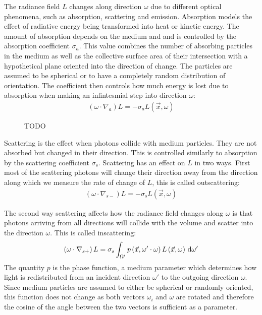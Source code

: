 The radiance field $L$ changes along direction $\omega$ due to different optical phenomena, such as absorption, scattering and emission. Absorption models the effect of radiative energy being transformed into heat or kinetic energy. The amount of absorption depends on the medium and and is controlled by the absorption coefficient $\sigma_a$. This value combines the number of absorbing particles in the medium as well as the collective surface area of their intersection with a hypothetical plane oriented into the direction of change. The particles are assumed to be spherical or to have a completely random distribution of orientation. The coefficient then controls how much energy is lost due to absorption when making an infintesmial step into direction $\omega$:
\begin{align}
\left(\omega\cdot\nabla_{a}\right)L = -\sigma_a L\left(\vec{x}, \omega \right)
\end{align}

\begin{figure}[t]
\centering
{}
\caption{TODO}
\label{fig:rte_change_L_all}
\end{figure}


Scattering is the effect when photons collide with medium particles. They are not absorbed but changed in their direction. This is controlled similarly to absorption by the scattering coefficient $\sigma_s$. Scattering has an effect on $L$ in two ways. First most of the scattering photons will change their direction away from the direction along which we measure the rate of change of $L$, this is called outscattering:
\begin{align}
\left(\omega\cdot\nabla_{s-}\right)L = -\sigma_s L\left(\vec{x}, \omega \right)
\end{align}

The second way scattering affects how the radiance field changes along $\omega$ is that photons arriving from all directions will collide with the volume and scatter into the direction $\omega$. This is called inscattering:
\begin{align}
\left(\omega\cdot\nabla_{s+}\right)L = \sigma_s \int_{\Omega'}p\left(\vec{x}, \omega'\cdot\omega\right)L\left(\vec{x}, \omega \right)\,\mathrm{d}\omega'
\label{eq:rte_inscattering}
\end{align}
The quantity $p$ is the phase function, a medium parameter which determines how light is redistributed from an incident direction $\omega'$ to the outgoing direction $\omega$. Since medium particles are assumed to either be spherical or randomly oriented, this function does not change as both vectors $\omega_i$ and $\omega$ are rotated and therefore the cosine of the angle between the two vectors is sufficient as a parameter.

